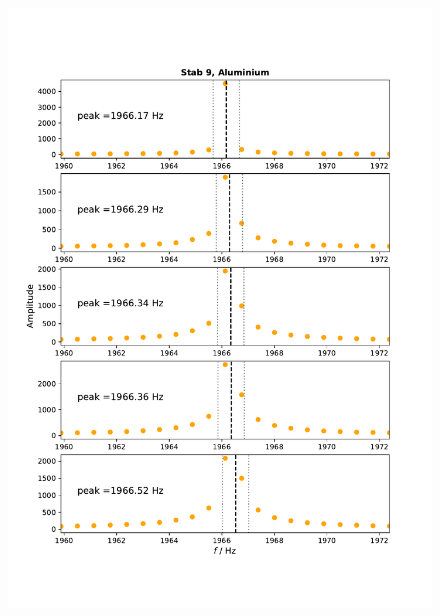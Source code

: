 \documentclass[a4paper, 12pt]{scrartcl}
\begin{document}
\begin{figure}[H]
	\centering
	\includegraphics[width=\linewidth]{plots/anhang3.pdf}
\end{figure}
\end{document}
